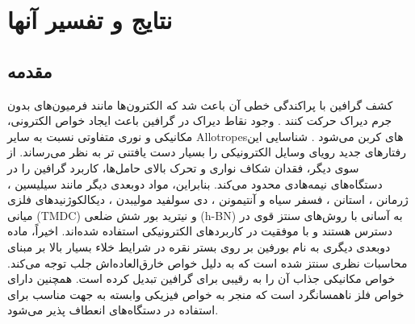 \chapter{نتایج و تفسیر آنها}
\clearpage
\section{مقدمه}
کشف گرافین با پراکندگی خطی آن باعث شد که الکترون‌ها مانند فر‌میون‌های بدون جرم دیراک حرکت کنند \cite{novoselovElectricFieldEffect2004,Geim2009Graphene}. وجود نقاط دیراک در گرافین باعث ایجاد خواص الکترونی، مکانیکی و نوری متفاوتی نسبت به سایر \gls{Allotropes}های کربن ‌‌می‌‌شود \cite{CastroNeto2009electronic}. شناسایی این رفتارهای جدید رویای وسایل الکترونیکی را بسیار دست یافتنی تر به نظر ‌‌می‌‌رساند. از سوی دیگر، فقدان شکاف نواری و تحرک بالای حامل‌ها، کاربرد گرافین را در دستگاه‌های نیمه‌هادی محدود ‌‌می‌‌کند. بنابراین، مواد دوبعدی دیگر مانند سیلیسین \cite{Splendiani2010Emerging}، ژرمانن \cite{Vogt2012Silicene}، استانن \cite{Davila2014Germanene}، فسفر سیاه \cite{Zhu2015Epitaxial} و آنتیمونن \cite{Eswaraiah2016Black}، دی سولفید مولیبدن \cite{Ji2016Twodimensional}، دیکالکوژنیدهای فلزی ‌میانی (\gls{TMDC}) و نیترید بور شش ضلعی (\gls{h-BN}) \cite{wangElectronicsOptoelectronicsTwodimensional2012} به آسانی با روش‌های سنتز قوی در دسترس هستند و با موفقیت در کاربردهای الکترونیکی استفاده شده‌اند. اخیراً، ماده دوبعدی دیگری به نام ‌بورفین بر روی بستر نقره \cite{mannixSynthesisBorophenesAnisotropic2015, fengExperimentalRealizationTwodimensional2016} در شرایط خلاء بسیار بالا بر مبنای محاسبات نظری \cite{Zhai2003Hydrocarbon,Szwacki2007B} سنتز شده است که به دلیل خواص خارق‌العاده‌اش جلب توجه ‌می‌کند. خواص مکانیکی جذاب آن را به رقیبی برای گرافین تبدیل کرده است. همچنین دارای خواص فلز ناهمسانگرد است که منجر به خواص فیزیکی وابسته به جهت مناسب برای استفاده در دستگاه‌های انعطاف پذیر ‌‌می‌‌شود.

